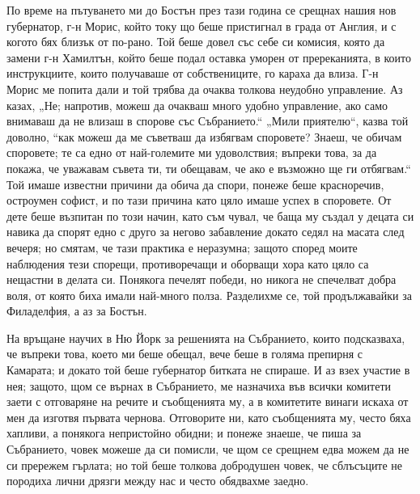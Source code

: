 \documentclass[12pt]{book}
\begin{document}
По време на пътуването ми до Бостън през тази година се срещнах нашия нов губернатор, г-н Морис, който току що беше пристигнал в града от Англия, и с когото бях близък от по-рано. Той беше довел със себе си комисия, която да замени г-н Хамилтън, който беше подал оставка уморен от пререканията, в които инструкциите, които получаваше от собствениците, го караха да влиза. Г-н Морис ме попита дали и той трябва да очаква толкова неудобно управление. Аз казах, „Не; напротив, можеш да очакваш много удобно управление, ако само внимаваш да не влизаш в спорове със Събранието.“ „Мили приятелю“, казва той доволно, “как можеш да ме съветваш да избягвам споровете? Знаеш, че обичам споровете; те са едно от най-големите ми удоволствия; въпреки това, за да покажа, че уважавам съвета ти, ти обещавам, че ако е възможно ще ги отбягвам.“ Той имаше известни причини да обича да спори, понеже беше красноречив, остроумен софист, и по тази причина като цяло имаше успех в споровете. От дете беше възпитан по този начин, като съм чувал, че баща му създал у децата си навика да спорят едно с друго за негово забавление докато седял на масата след вечеря; но смятам, че тази практика е неразумна; защото според моите наблюдения тези спорещи, противоречащи и оборващи хора като цяло са нещастни в делата си. Понякога печелят победи, но никога не спечелват добра воля, от която биха имали най-много полза. Разделихме се, той продължавайки за Филаделфия, а аз за Бостън.

На връщане научих в Ню Йорк за решенията на Събранието, които подсказваха, че въпреки това, което ми беше обещал, вече беше в голяма препирня с Камарата; и докато той беше губернатор битката не спираше. И аз взех участие в нея; защото, щом се върнах в Събранието, ме назначиха във всички комитети заети с отговаряне на речите и съобщенията му, а в комитетите винаги искаха от мен да изготвя първата чернова. Отговорите ни, като съобщенията му, често бяха хапливи, а понякога непристойно обидни; и понеже знаеше, че пиша за Събранието, човек можеше да си помисли, че щом се срещнем едва можем да не си прережем гърлата; но той беше толкова добродушен човек, че сблъсъците не породиха лични дрязги между нас и често обядвахме заедно. 
\end{document}
